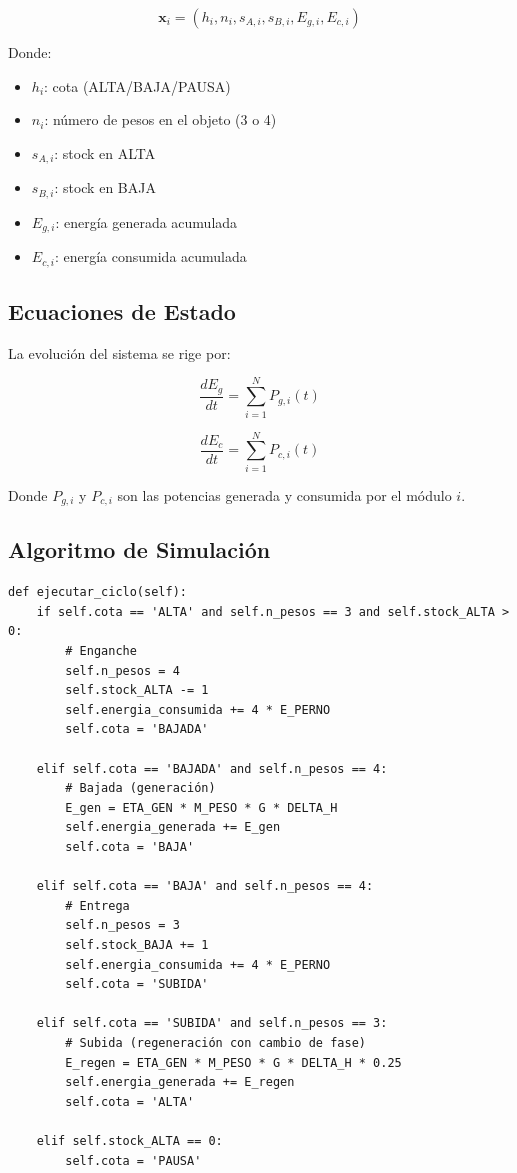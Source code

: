 \documentclass[12pt,a4paper]{article}
\newcommand{\vect}[1]{\mathbf{#1}}
\newcommand{\deriv}[2]{\frac{d#1}{d#2}}
\begin{document}
\begin{equation}
\vect{x}_i = (h_i, n_i, s_{A,i}, s_{B,i}, E_{g,i}, E_{c,i})
\end{equation}

Donde:
\begin{itemize}
    \item $h_i$: cota (ALTA/BAJA/PAUSA)
    \item $n_i$: número de pesos en el objeto (3 o 4)
    \item $s_{A,i}$: stock en ALTA
    \item $s_{B,i}$: stock en BAJA
    \item $E_{g,i}$: energía generada acumulada
    \item $E_{c,i}$: energía consumida acumulada
\end{itemize}

\subsection{Ecuaciones de Estado}

La evolución del sistema se rige por:

\begin{equation}
\deriv{E_g}{t} = \sum_{i=1}^{N} P_{g,i}(t)
\end{equation}

\begin{equation}
\deriv{E_c}{t} = \sum_{i=1}^{N} P_{c,i}(t)
\end{equation}

Donde $P_{g,i}$ y $P_{c,i}$ son las potencias generada y consumida por el módulo $i$.

\subsection{Algoritmo de Simulación}

\begin{lstlisting}[style=python, caption={Simulación de un módulo Kilómetro}]
def ejecutar_ciclo(self):
    if self.cota == 'ALTA' and self.n_pesos == 3 and self.stock_ALTA > 0:
        # Enganche
        self.n_pesos = 4
        self.stock_ALTA -= 1
        self.energia_consumida += 4 * E_PERNO
        self.cota = 'BAJADA'
        
    elif self.cota == 'BAJADA' and self.n_pesos == 4:
        # Bajada (generación)
        E_gen = ETA_GEN * M_PESO * G * DELTA_H
        self.energia_generada += E_gen
        self.cota = 'BAJA'
        
    elif self.cota == 'BAJA' and self.n_pesos == 4:
        # Entrega
        self.n_pesos = 3
        self.stock_BAJA += 1
        self.energia_consumida += 4 * E_PERNO
        self.cota = 'SUBIDA'
        
    elif self.cota == 'SUBIDA' and self.n_pesos == 3:
        # Subida (regeneración con cambio de fase)
        E_regen = ETA_GEN * M_PESO * G * DELTA_H * 0.25
        self.energia_generada += E_regen
        self.cota = 'ALTA'
        
    elif self.stock_ALTA == 0:
        self.cota = 'PAUSA'
\end{lstlisting}
\end{document}
